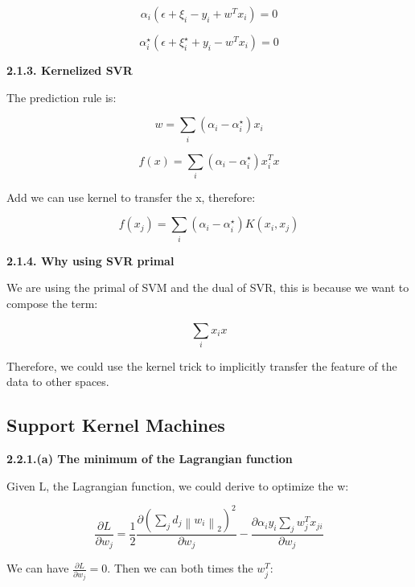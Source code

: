 \documentclass{article} %
\newcommand{\norm}[1]{\left\lVert #1 \right\rVert}
\begin{document}
\begin{equation}
\alpha_i (\epsilon + \xi_i - y_i + w^T x_i) = 0
\end{equation}

\begin{equation}
\alpha_i^{\star} (\epsilon + \xi_i^{\star} + y_i - w^T x_i) = 0
\end{equation}

\textbf{2.1.3. Kernelized SVR}

The prediction rule is:

\begin{equation}
w = \sum_i (\alpha_i - \alpha_i^{\star}) x_i
\end{equation}

\begin{equation}
f(x) = \sum_i (\alpha_i - \alpha_i^{\star}) x_i^T x
\end{equation}

Add we can use kernel to transfer the x, therefore:

\begin{equation}
f(x_j) = \sum_i (\alpha_i - \alpha_i^{\star}) K(x_i, x_j)
\end{equation}

\textbf{2.1.4. Why using SVR primal}


We are using the primal of SVM and the dual of SVR, this is because we want to
compose the term:

\begin{equation}
\sum_i x_i x
\end{equation}

Therefore, we could use the kernel trick to implicitly transfer the feature of
the data to other spaces.


\subsection{Support Kernel Machines}

\textbf{2.2.1.(a) The minimum of the Lagrangian function}

Given L, the Lagrangian function, we could derive to optimize the w:

\begin{equation}
\frac{\partial L}{\partial w_j} = \frac{1}{2} \frac{\partial (\sum_j d_j
\norm{w_i}_2)^2}{\partial w_j} - \frac{\partial \alpha_i y_i \sum_j w_j^T
x_{ji}}{\partial w_j}
\end{equation}

We can have $\frac{\partial L}{\partial w_j} = 0$. Then we can both times the
$w_j^T$:
\end{document}

